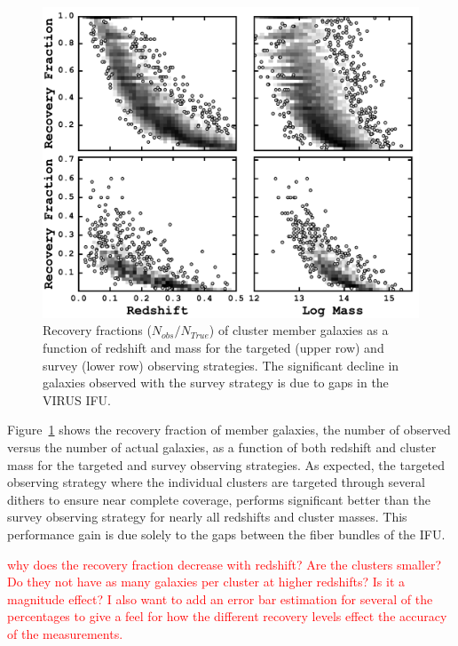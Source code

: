 \documentclass[apj, revtex4]{emulateapj}
\newcommand{\editorial}[1]{\textcolor{red}{#1}}
\begin{document}
\begin{figure} 
	\includegraphics[width=\textwidth]{recovery.pdf} 
	\caption{Recovery fractions ($N_{obs}/N_{True}$) of cluster member galaxies as a function of redshift and mass for the targeted (upper row) and survey (lower row) observing strategies. The significant decline in galaxies observed with the survey strategy is due to gaps in the VIRUS IFU.} \label{fig: recovery} 
\end{figure}

Figure~\ref{fig: recovery} shows the recovery fraction of member galaxies, the number of observed versus the number of actual galaxies, as a function of both redshift and cluster mass for the targeted and survey observing strategies. As expected, the targeted observing strategy where the individual clusters are targeted through several dithers to ensure near complete coverage, performs significant better than the survey observing strategy for nearly all redshifts and cluster masses. This performance gain is due solely to the gaps between the fiber bundles of the IFU. 

\editorial{why does the recovery fraction decrease with redshift? Are the clusters smaller? Do they not have as many galaxies per cluster at higher redshifts? Is it a magnitude effect? I also want to add an error bar estimation for several of the percentages to give a feel for how the different recovery levels effect the accuracy of the measurements.}
\end{document}
